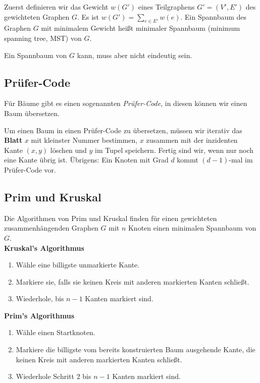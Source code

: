 \documentclass[12pt]{article}
\begin{document}
Zuerst definieren wir das Gewicht $w(G')$ eines Teilgraphens $G' = (V', E')$ des gewichteten Graphen $G$. Es ist $w(G') = \sum_{e \in E'} w(e)$. Ein Spannbaum des Graphen $G$ mit minimalem Gewicht heißt minimaler Spannbaum (minimum spanning tree, MST) von $G$.

Ein Spannbaum von $G$ kann, muss aber nicht eindeutig sein.

\subsection{Prüfer-Code}

Für Bäume gibt es einen sogenannten \textit{Prüfer-Code}, in diesen können wir einen Baum übersetzen.

Um einen Baum in einen Prüfer-Code zu übersetzen, müssen wir iterativ das \textbf{Blatt} $x$ mit kleinster Nummer bestimmen, $x$ zusammen mit der inzidenten Kante $(x, y)$ löschen und $y$ im Tupel speichern. Fertig sind wir, wenn nur noch eine Kante übrig ist. Übrigens: Ein Knoten mit Grad $d$ kommt $(d-1)$-mal im Prüfer-Code vor.

\subsection{Prim und Kruskal}

Die Algorithmen von Prim und Kruskal finden für einen gewichteten zusammenhängenden Graphen $G$ mit $n$ Knoten einen minimalen Spannbaum von $G$.\\

\textbf{Kruskal's Algorithmus}

\begin{enumerate}
\item Wähle eine billigste unmarkierte Kante.
\item Markiere sie, falls sie keinen Kreis mit anderen markierten Kanten schließt.
\item Wiederhole, bis $n-1$ Kanten markiert sind.
\end{enumerate}

\textbf{Prim's Algorithmus}

\begin{enumerate}
\item Wähle einen Startknoten.
\item Markiere die billigste vom bereits konstruierten Baum ausgehende Kante, die keinen Kreis mit anderen markierten Kanten schließt.
\item Wiederhole Schritt 2 bis $n-1$ Kanten markiert sind.
\end{enumerate}
\end{document}
